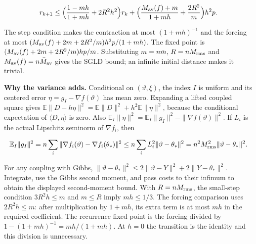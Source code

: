 \documentclass[11pt,a4paper]{article}
\begin{document}
\[r_{k+1}\le\Bigl(\frac{1-mh}{1+mh}+2R^2h^2\Bigr)r_k
+\Bigl(\frac{M_{\rm av}(f)+m}{1+mh}+\frac{2R^2}m\Bigr)h^2p.\]


The step condition makes the contraction at most \((1+mh)^{-1}\) and the
forcing at most \((M_{\rm av}(f)+2m+2R^2/m)h^2p/(1+mh)\). The fixed point is
\((M_{\rm av}(f)+2m+2R^2/m)hp/m\). Substituting \(m=n\bar m\),
\(R=nM_{\rm rms}\) and \(M_{\rm av}(f)=n\bar M_{\rm av}\) gives the SGLD
bound; an infinite initial distance makes it trivial.




\textbf{Why the variance adds.} Conditional on \((\vartheta,\xi)\), the index \(I\) is uniform and its centered error \(\eta=g_I-\nabla f(\vartheta)\) has mean zero. Expanding a lifted coupled square gives \(\mathbb E\|D-h\eta\|^2=\mathbb E\|D\|^2+h^2\mathbb E\|\eta\|^2\), because the conditional expectation of \(\langle D,\eta\rangle\) is zero. Also \(\mathbb E_I\|\eta\|^2=\mathbb E_I\|g_I\|^2-\|\nabla f(\vartheta)\|^2\). If \(L_i\) is the actual Lipschitz seminorm of \(\nabla f_i\), then

\[\mathbb E_I\|g_I\|^2=n\sum_i\|\nabla f_i(\vartheta)-\nabla f_i(\theta_*)\|^2\le n\sum_iL_i^2\|\vartheta-\theta_*\|^2=n^2M_{\rm rms}^2\|\vartheta-\theta_*\|^2.\]

For any coupling with Gibbs, \(\|\vartheta-\theta_*\|^2\le2\|\vartheta-Y\|^2+2\|Y-\theta_*\|^2\). Integrate, use the Gibbs second moment, and pass costs to their infimum to obtain the displayed second-moment bound. With \(R=nM_{\rm rms}\), the small-step condition \(3R^2h\le m\) and \(m\le R\) imply \(mh\le1/3\). The forcing comparison uses \(2R^2h\le m\): after multiplication by \(1+mh\), its extra term is at most \(mh\) in the required coefficient. The recurrence fixed point is the forcing divided by \(1-(1+mh)^{-1}=mh/(1+mh)\). At \(h=0\) the transition is the identity and this division is unnecessary.
\end{document}
